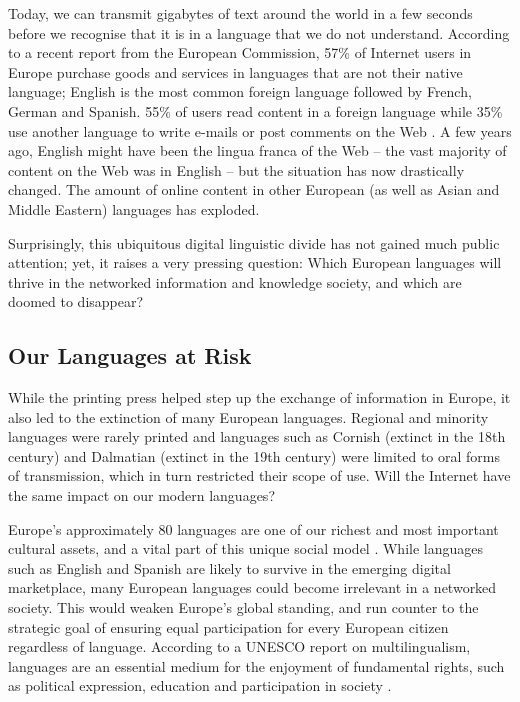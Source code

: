 \begin{multicols}{2}
Today, we can transmit gigabytes of text around the world in a few
seconds before we recognise that it is in a language that we do not
understand. According to a recent report from the European Commission,
57\% of Internet users in Europe purchase goods and services in
languages that are not their native language; English is the most
common foreign language followed by French, German and Spanish. 55\%
of users read content in a foreign language while 35\% use another
language to write e-mails or post comments on the Web \cite{EC1}. A
few years ago, English might have been the lingua franca of the
Web -- the vast majority of content on the Web was in English -- but the
situation has now drastically changed. The amount of online content in
other European (as well as Asian and Middle Eastern) languages has
exploded.

Surprisingly, this ubiquitous digital linguistic divide has not gained much public attention; yet, it raises a very pressing question: Which European languages will thrive in the networked information and knowledge society, and which are doomed to disappear?

\subsection{Our Languages at Risk}

While the printing press helped step up the exchange of information in
Europe, it also led to the extinction of many European
languages. Regional and minority languages were rarely printed and
languages such as Cornish (extinct in the 18th century) and Dalmatian
(extinct in the 19th century) were limited to oral forms of
transmission, which in turn restricted their scope of use. Will the
Internet have the same impact on our modern languages?


Europe’s approximately 80 languages are one of our richest and most important cultural assets, and a vital part of this unique social model \cite{EC2}. While languages such as English and Spanish are likely to survive in the emerging digital marketplace, many European languages could become irrelevant in a networked society. This would weaken Europe’s global standing, and run counter to the strategic goal of ensuring equal participation for every European citizen regardless of language. According to a UNESCO report on multilingualism, languages are an essential medium for the enjoyment of fundamental rights, such as political expression, education and participation in society \cite{Unesco1}.


\end{multicols}
